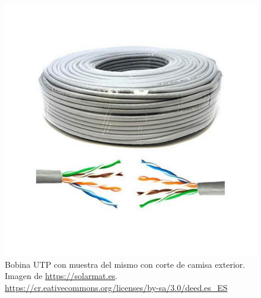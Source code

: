 \begin{figure}
    \centering
    \includegraphics[width=.6\textwidth]{img/bobina_UTP.pdf}
    \caption[Bobina UTP]{Bobina UTP con muestra del mismo con corte de camisa exterior. Imagen de \url{https://solarmat.es}\cite{wiki:Creative}. \url{https://cr.eativecommons.org/licenses/by-sa/3.0/deed.es_ES} } \label{Img:Bobina UTP}
\end{figure}

